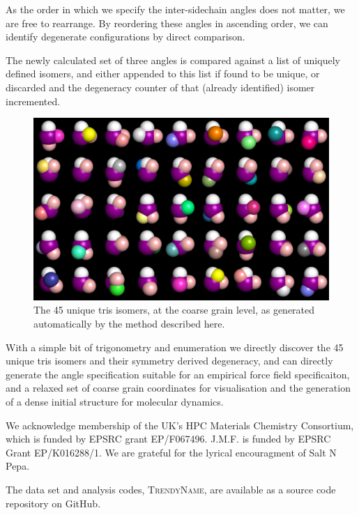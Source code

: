 \documentclass[journal=nanofd,manuscript=suppinfo]{achemso}
\begin{document}
As the order in which we specify the inter-sidechain angles does not matter, we
are free to rearrange.
By reordering these angles in ascending order, we can identify degenerate
configurations by direct comparison.

The newly calculated set of three angles is compared against a list of uniquely
defined isomers, and either appended to this list if found to be unique, or
discarded and the degeneracy counter of that (already identified) isomer incremented.

\begin{figure}[ht!]
    \begin{center}
        \includegraphics[width=\textwidth]{tris_45_isomers.png}
            \caption{\label{fig-trisCG}The 45 unique tris isomers, at the coarse grain level, as generated automatically by the method described here.}
    \end{center}
\end{figure}



With a simple bit of trigonometry and enumeration we directly discover the 45
unique tris isomers and their symmetry derived degeneracy, and can directly
generate the angle specification suitable for an empirical force field
specificaiton, and a relaxed set of coarse grain coordinates for visualisation
and the generation of a dense initial structure for molecular dynamics.

\begin{acknowledgement}
We acknowledge membership of the UK's HPC Materials Chemistry Consortium, which is funded by EPSRC grant EP/F067496. 
J.M.F. is funded by EPSRC Grant EP/K016288/1.
We are grateful for the lyrical encouragment of Salt N Pepa. 
\end{acknowledgement}

\begin{suppinfo}
    The data set and analysis codes, \textsc{TrendyName}, are available as a source code repository on GitHub\cite{GitHub}.
\end{suppinfo}


\end{document}
